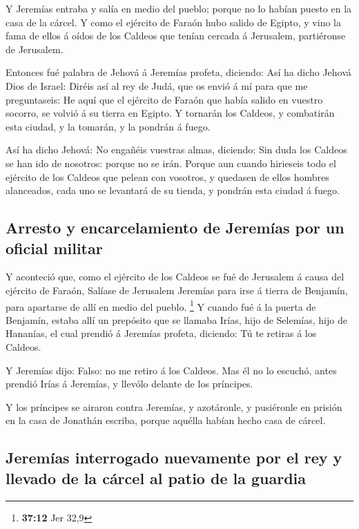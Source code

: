  Y Jeremías entraba y salía en medio del pueblo; porque no
lo habían puesto en la casa de la cárcel.  Y como el
ejército de Faraón hubo salido de Egipto, y vino la fama de ellos á
oídos de los Caldeos que tenían cercada á Jerusalem, partiéronse de
Jerusalem.

 Entonces fué palabra de Jehová á Jeremías profeta,
diciendo:  Así ha dicho Jehová Dios de Israel: Diréis así
al rey de Judá, que os envió á mí para que me preguntaseis: He aquí que
el ejército de Faraón que había salido en vuestro socorro, se volvió á
su tierra en Egipto.  Y tornarán los Caldeos, y combatirán
esta ciudad, y la tomarán, y la pondrán á fuego.

 Así ha dicho Jehová: No engañéis vuestras almas,
diciendo: Sin duda los Caldeos se han ido de nosotros: porque no se
irán.  Porque aun cuando hirieseis todo el ejército de
los Caldeos que pelean con vosotros, y quedasen de ellos hombres
alanceados, cada uno se levantará de su tienda, y pondrán esta ciudad á
fuego.

\hypertarget{arresto-y-encarcelamiento-de-jeremuxedas-por-un-oficial-militar}{%
\subsection{Arresto y encarcelamiento de Jeremías por un oficial
militar}\label{arresto-y-encarcelamiento-de-jeremuxedas-por-un-oficial-militar}}

 Y aconteció que, como el ejército de los Caldeos se fué
de Jerusalem á causa del ejército de Faraón,  Salíase de
Jerusalem Jeremías para irse á tierra de Benjamín, para apartarse de
allí en medio del pueblo. \footnote{\textbf{37:12} Jer 32,9}
 Y cuando fué á la puerta de Benjamín, estaba allí un
prepósito que se llamaba Irías, hijo de Selemías, hijo de Hananías, el
cual prendió á Jeremías profeta, diciendo: Tú te retiras á los Caldeos.

 Y Jeremías dijo: Falso: no me retiro á los Caldeos. Mas
él no lo escuchó, antes prendió Irías á Jeremías, y llevólo delante de
los príncipes.

 Y los príncipes se airaron contra Jeremías, y
azotáronle, y pusiéronle en prisión en la casa de Jonathán escriba,
porque aquélla habían hecho casa de cárcel.

\hypertarget{jeremuxedas-interrogado-nuevamente-por-el-rey-y-llevado-de-la-cuxe1rcel-al-patio-de-la-guardia}{%
\subsection{Jeremías interrogado nuevamente por el rey y llevado de la
cárcel al patio de la
guardia}\label{jeremuxedas-interrogado-nuevamente-por-el-rey-y-llevado-de-la-cuxe1rcel-al-patio-de-la-guardia}}

